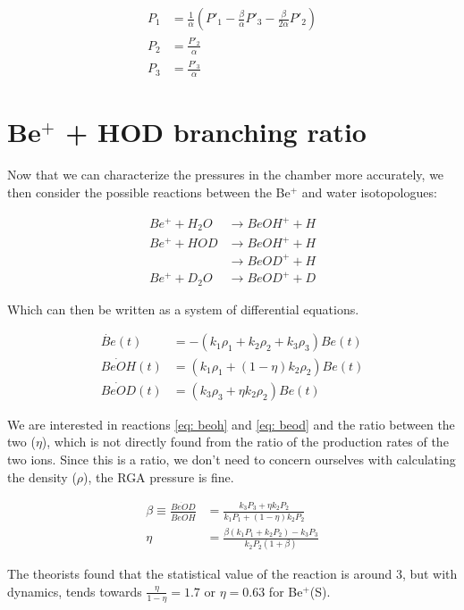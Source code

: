 \documentclass[a4paper]{article}
\begin{document}
\begin{align}
P_1 & = \frac{1}{\alpha}\left(P'_1 - \frac{\beta}{\alpha}P'_3 - \frac{\beta}{2\alpha} P'_2\right) \\
P_2 & = \frac{P'_2}{\alpha} \\
P_3 & = \frac{P'_3}{\alpha}
\end{align}

\section{Be$^+$ + HOD branching ratio}

Now that we can characterize the pressures in the chamber more accurately, we then consider the possible reactions between the Be$^+$ and water isotopologues:

\begin{align}
Be^+ + H_2O & \rightarrow BeOH^+ + H \\
Be^+ + HOD & \rightarrow BeOH^+ + H \label{eq: beoh} \\
 & \rightarrow BeOD^+ + H \label{eq: beod} \\
Be^+ + D_2O & \rightarrow BeOD^+ + D
\end{align}

Which can then be written as a system of differential equations.

\begin{align}
\dot{Be}(t) & = -(k_1\rho_1+k_2\rho_2+k_3\rho_3)Be(t) \\
\dot{BeOH}(t) & = (k_1\rho_1+(1-\eta)k_2\rho_2)Be(t) \\
\dot{BeOD}(t) & = (k_3\rho_3+\eta k_2\rho_2)Be(t)
\end{align}

We are interested in reactions \ref{eq: beoh} and \ref{eq: beod} and the ratio between the two ($\eta$), which is not directly found from the ratio of the production rates of the two ions. Since this is a ratio, we don't need to concern ourselves with calculating the density ($\rho$), the RGA pressure is fine.

\begin{align}
\beta \equiv \frac{\dot{BeOD}}{\dot{BeOH}} & = \frac{k_3P_3 + \eta k_2P_2}{k_1P_1 + (1-\eta)k_2P_2} \\
\eta & = \frac{\beta(k_1P_1 + k_2P_2)-k_3P_3}{k_2P_2(1+\beta)}
\end{align}

The theorists found that the statistical value of the reaction is around 3, but with dynamics, tends towards $\frac{\eta}{1-\eta} = 1.7$ or $\eta=0.63$ for Be$^+$(S).



\end{document}

